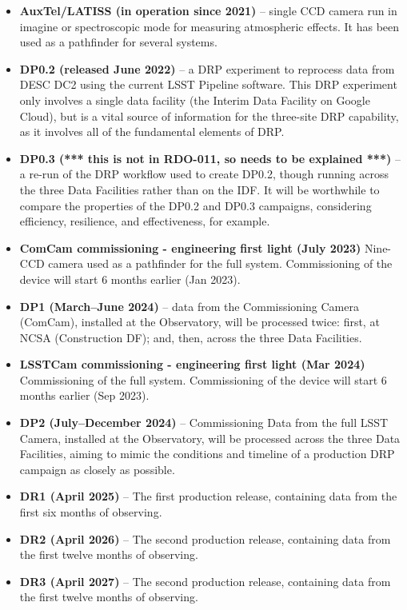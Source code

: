 \begin{itemize}

\item {\bf AuxTel/LATISS (in operation since 2021)} -- single CCD
  camera run in imagine or spectroscopic mode for measuring
  atmospheric effects. It has been used as a pathfinder for several systems.
  
\item {\bf DP0.2 (released June 2022)} -- a DRP experiment to reprocess data from DESC DC2 using the current LSST Pipeline software. This DRP experiment only involves a single data facility (the Interim Data Facility on Google Cloud), but is a vital source of information for the three-site DRP capability, as it involves all of the fundamental elements of DRP.
  
\item {\bf DP0.3 (*** this is not in RDO-011, so needs to be explained ***)} -- a re-run of the DRP workflow used to create DP0.2, though running across the three Data Facilities rather than on the IDF. It will be worthwhile to compare the properties of the DP0.2 and DP0.3 campaigns, considering efficiency, resilience, and effectiveness, for example.

\item{\bf ComCam commissioning - engineering first light (July 2023)}
  Nine-CCD camera used as a pathfinder for the full
  system. Commissioning of the device will start 6 months earlier (Jan 2023).
  
\item {\bf DP1 (March--June 2024)} -- data from the Commissioning Camera (ComCam), installed at the Observatory, will be processed twice: first, at NCSA (Construction DF); and, then, across the three Data Facilities.

 \item{\bf LSSTCam commissioning - engineering first light (Mar 2024)}
 Commissioning of the full
  system. Commissioning of the device will start 6 months earlier (Sep
  2023).
  
\item {\bf DP2 (July--December 2024)} – Commissioning Data from the full LSST Camera, installed at the Observatory, will be processed across the three Data Facilities, aiming to mimic the conditions and timeline of a production DRP campaign as closely as possible.

\item {\bf DR1 (April 2025)} -- The first production release, containing data from the first six months of observing.
  
\item {\bf DR2 (April 2026)} -- The second production release, containing data from the first twelve months of observing.
  
\item {\bf DR3 (April 2027)} -- The second production release, containing data from the first twelve months of observing.
  
\end{itemize}

